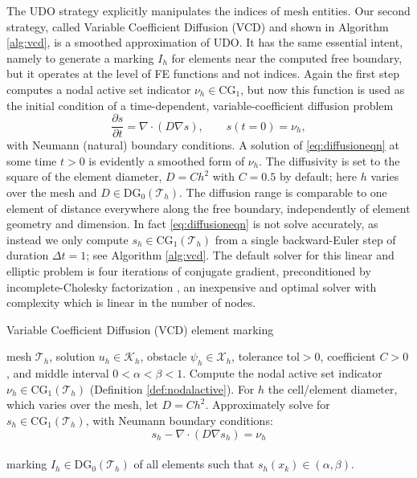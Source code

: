 \documentclass[]{interact}
\theoremstyle{plain}%
\theoremstyle{definition}
\theoremstyle{remark}
\newcommand{\grad}{\nabla}
\newcommand{\Div}{\nabla\cdot}
\newcommand{\cK}{\mathcal{K}}
\newcommand{\cT}{\mathcal{T}}
\newcommand{\cX}{\mathcal{X}}
\newcommand{\CG}{\text{CG}}
\newcommand{\DG}{\text{DG}}
\begin{document}
The UDO strategy explicitly manipulates the indices of mesh entities.  Our second strategy, called Variable Coefficient Diffusion (VCD) and shown in Algorithm \ref{alg:vcd}, is a smoothed approximation of UDO.  It has the same essential intent, namely to generate a marking $I_h$ for elements near the computed free boundary, but it operates at the level of FE functions and not indices.  Again the first step computes a nodal active set indicator $\nu_h \in \CG_1$, but now this function is used as the initial condition of a time-dependent, variable-coefficient diffusion problem
\begin{equation} \label{eq:diffusioneqn}
\frac{\partial s}{\partial t} = \Div\left(D \grad s\right), \qquad s(t=0) = \nu_h,
\end{equation}
with Neumann (natural) boundary conditions.  A solution of \eqref{eq:diffusioneqn} at some time $t>0$ is evidently a smoothed form of $\nu_h$.  The diffusivity is set to the square of the element diameter, $D=C h^2$ with $C=0.5$ by default; here $h$ varies over the mesh and $D \in \DG_0(\cT_h)$.  The diffusion range is comparable to one element of distance everywhere along the free boundary, independently of element geometry and dimension.  In fact \eqref{eq:diffusioneqn} is not solve accurately, as instead we only compute $s_h\in\CG_1(\cT_h)$ from a single backward-Euler step of duration $\Delta t = 1$; see Algorithm \ref{alg:vcd}.  The default solver for this linear and elliptic problem is four iterations of conjugate gradient, preconditioned by incomplete-Cholesky factorization \cite{Bueler2021}, an inexpensive and optimal solver with complexity which is linear in the number of nodes.

\begin{algorithm}[ht]
	\caption{Variable Coefficient Diffusion (VCD) element marking}
	\begin{algorithmic}[1]
		\Require mesh $\cT_h$, solution $u_h \in \cK_h$, obstacle $\psi_h \in \cX_h$, tolerance $\text{tol} > 0$, coefficient $C>0$, and middle interval $0 < \alpha < \beta < 1$.
		\State Compute the nodal active set indicator $\nu_h \in \CG_1(\cT_h)$ (Definition \ref{def:nodalactive}).
		\State For $h$ the cell/element diameter, which varies over the mesh, let $D=C h^2$.
		\State Approximately solve for $s_h\in\CG_1(\cT_h)$, with Neumann boundary conditions:
		  $$s_h - \Div(D \grad s_h) = \nu_h$$ \\
		\Return marking $I_h \in \DG_0(\cT_h)$ of all elements such that $s_h(x_k) \in (\alpha,\beta)$.
    \end{algorithmic}
\label{alg:vcd}
\end{algorithm}
\end{document}
